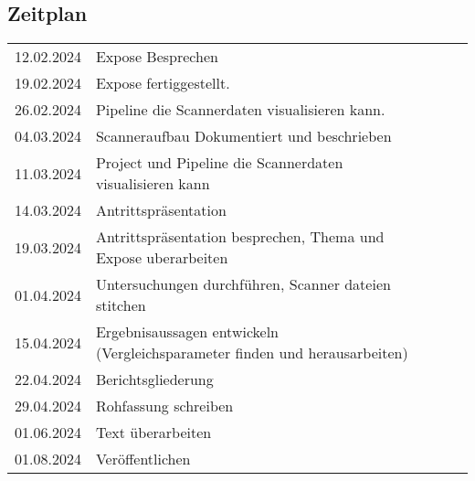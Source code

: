 \documentclass[../main.tex]{subfiles}
\begin{document}
\begin{table}[h]
    \subsection*{Zeitplan}
    \begin{tabular}{lllll}
    \multicolumn{1}{r}{12.02.2024} & Expose Besprechen                                                           &  &  &  \\
    \multicolumn{1}{r}{19.02.2024} & Expose fertiggestellt.                                                      &  &  &  \\
    \multicolumn{1}{r}{26.02.2024} & Pipeline die Scannerdaten visualisieren kann.                               &  &  &  \\
    \multicolumn{1}{r}{04.03.2024} & Scanneraufbau Dokumentiert und beschrieben                                  &  &  &  \\
    \multicolumn{1}{r}{11.03.2024} & Project und Pipeline die Scannerdaten visualisieren kann                    &  &  &  \\
    \multicolumn{1}{r}{14.03.2024} & Antrittspräsentation                                                        &  &  &  \\
    \multicolumn{1}{r}{19.03.2024} & Antrittspräsentation besprechen, Thema und Expose uberarbeiten              &  &  &  \\
    \multicolumn{1}{r}{01.04.2024} & Untersuchungen durchführen, Scanner dateien stitchen                        &  &  &  \\
    \multicolumn{1}{r}{15.04.2024} & Ergebnisaussagen entwickeln (Vergleichsparameter finden und herausarbeiten) &  &  &  \\
    \multicolumn{1}{r}{22.04.2024} & Berichtsgliederung                                                          &  &  &  \\
    \multicolumn{1}{r}{29.04.2024} & Rohfassung schreiben                                                        &  &  &  \\
    \multicolumn{1}{r}{01.06.2024} & Text überarbeiten                                                           &  &  &  \\
    \multicolumn{1}{r}{01.08.2024} & Veröffentlichen                                                             &  &  & 
    \end{tabular}
\end{table}
\end{document}
